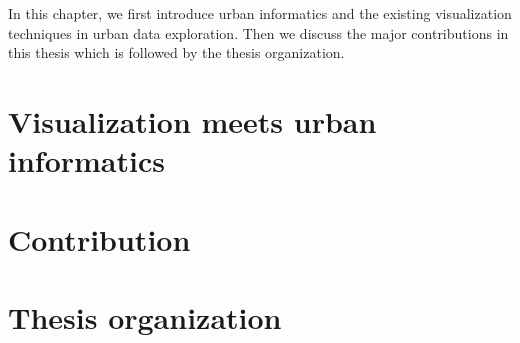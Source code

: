 In this chapter, we first introduce urban informatics and the existing visualization techniques in urban data exploration. Then we discuss the major contributions in this thesis which is followed by the thesis organization.

\section{Visualization meets urban informatics}

\section{Contribution}

\section{Thesis organization}